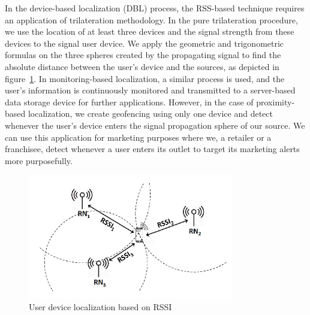 \documentclass[a4paper,singleside,12pt]{report} %
\begin{document}
					In the device-based localization (DBL) process, the RSS-based technique requires an application of trilateration methodology. 
					In the pure trilateration procedure, we use the location of at least three devices and the signal strength from these devices to the signal user device. 
					We apply the geometric and trigonometric formulas on the three spheres created by the propagating signal to find the absolute distance between the user's device and the sources, as depicted in figure~\ref{fig2.1}. 
					In monitoring-based localization, a similar process is used, and the user's information is continuously monitored and transmitted to a server-based data storage device for further applications. 
					However, in the case of proximity-based localization, we create geofencing using only one device and detect whenever the user's device enters the signal propagation sphere of our source. 
					We can use this application for marketing purposes where we, a retailer or a franchisee, detect whenever a user enters its outlet to target its marketing alerts more purposefully. 
					
					\begin{figure}[!htb]
					\centerline{\includegraphics[width=0.8\textwidth]{./figures/RSSI-indoor-localization.png}}
					\caption{User device localization based on RSSI}
					\label{fig2.1}
					\end{figure}
\end{document}
